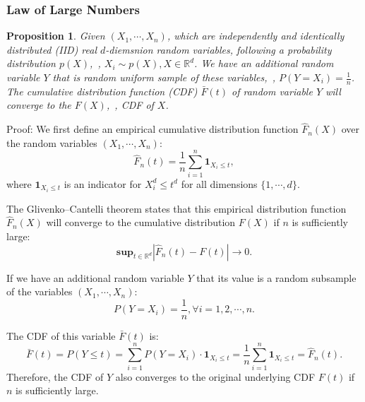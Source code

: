 \newtheorem{proposition}{Proposition}
\newtheorem{lemma}{Lemma}
\subsubsection{Law of Large Numbers}


\begin{proposition}\label{prop:large_samples}
Given $(X_1, \cdots, X_n)$, which are independently and identically distributed (IID) real $d$-diemsnion random variables, following a probability distribution $p(X)$,~\ie, $X_i \sim p(X), X \in \mathbb{R}^d$.
%
We have an additional random variable $Y$ that is random uniform sample of these variables,~\ie, $P(Y = X_i) = \frac{1}{n}$.
%
The cumulative distribution function (CDF) $\bar{F}(t)$ of random variable $Y$ will converge to the $F(X)$,~\ie, CDF of $X$.
\end{proposition}



%
Proof:
We first define an empirical cumulative distribution function $\hat{F}_n(X)$ over the random variables $(X_1, \cdots, X_n)$:
\begin{equation}
    \hat{F}_n (t) = \frac{1}{n} \sum_{i=1}^{n} \mathbf{1}_{X_i \leq t},
\end{equation}
where $\mathbf{1}_{X_i \leq t}$ is an indicator for $X_i^d \leq t^d$ for all dimensions $\{1, \cdots, d\}$.

The Glivenko–Cantelli theorem states that this empirical distribution function $\hat{F}_n(X)$ will converge to the cumulative distribution $F(X)$ if $n$ is sufficiently large:
\begin{equation}
    \textbf{sup}_{t \in \mathbb{R}^d} | \hat{F}_n(t) - F(t) | \rightarrow 0.
\end{equation}

If we have an additional random variable $Y$ that its value is a random subsample of the variables $(X_1, \cdots, X_n)$:
\begin{equation}
    P(Y = X_i) = \frac{1}{n}, \forall i = 1, 2, \cdots, n.
\end{equation}

The CDF of this variable $\bar{F}(t)$ is:
\begin{equation}
    \bar{F}(t) = P(Y \leq t) = \sum_{i=1}^{n} P(Y = X_i) \cdot \mathbf{1}_{X_i \leq t} = \frac{1}{n} \sum_{i=1}^{n} \mathbf{1}_{X_i \leq t} = \hat{F}_n(t).
\end{equation}
Therefore, the CDF of $Y$ also converges to the original underlying CDF $F(t)$ if $n$ is sufficiently large.

